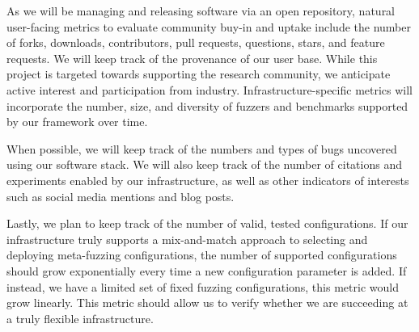 
As we will be managing and releasing software via an open repository, 
natural user-facing metrics to evaluate community buy-in and uptake include the number of forks, downloads, contributors, pull requests, questions, 
stars, and feature requests. 
We will keep track of the provenance of our user base. While this project is targeted towards supporting the research community, 
we anticipate active interest and participation from industry. 
Infrastructure-specific metrics will incorporate the number, size, and diversity of fuzzers and benchmarks supported by our framework over time.

When possible, we will keep track of the numbers and types of bugs uncovered using our software stack.
We will also keep track of the number of citations and experiments enabled by our infrastructure, as well 
as other indicators of interests such as social media mentions and blog posts.

Lastly, we plan to keep track of the number of valid, tested configurations.  If our infrastructure truly supports a 
mix-and-match approach to selecting and deploying meta-fuzzing configurations, the number of supported configurations 
should grow exponentially every time a new configuration parameter is added.  If instead, we have a limited set of fixed
fuzzing configurations, this metric would grow linearly.  This metric should allow us to verify whether we are succeeding at a truly
flexible infrastructure.
